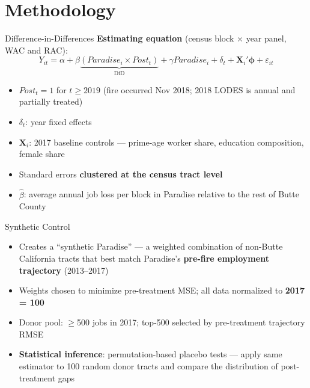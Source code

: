 \documentclass[aspectratio=169, 12pt]{beamer}
\begin{document}
\section{Methodology}

\begin{frame}{Difference-in-Differences}
  \textbf{Estimating equation} (census block $\times$ year panel, WAC and RAC):
  \[
    Y_{it} = \alpha + \beta \underbrace{(\textit{Paradise}_i \times \textit{Post}_t)}_{\text{DiD}}
           + \gamma \textit{Paradise}_i + \delta_t + \mathbf{X}_i' \boldsymbol{\phi} + \varepsilon_{it}
  \]
  \vspace{-0.5em}
  \begin{itemize}
    \item $\textit{Post}_t = 1$ for $t \geq 2019$ (fire occurred Nov 2018;
          2018 LODES is annual and partially treated)
    \item $\delta_t$: year fixed effects
    \item $\mathbf{X}_i$: 2017 baseline controls ---
          prime-age worker share, education composition, female share
    \item Standard errors \textbf{clustered at the census tract level}
    \item $\hat{\beta}$: average annual job loss per block in Paradise
          relative to the rest of Butte County
  \end{itemize}
\end{frame}

\begin{frame}{Synthetic Control}
  \begin{itemize}
    \item Creates a ``synthetic Paradise'' --- a weighted combination of
          non-Butte California tracts that best match Paradise's
          \textbf{pre-fire employment trajectory} (2013--2017)
    \item Weights chosen to minimize pre-treatment MSE;
          all data normalized to \textbf{2017 = 100}
    \item Donor pool: $\geq$500 jobs in 2017; top-500 selected by
          pre-treatment trajectory RMSE
    \item \textbf{Statistical inference}: permutation-based placebo tests ---
          apply same estimator to 100 random donor tracts and compare
          the distribution of post-treatment gaps
  \end{itemize}
\end{frame}
\end{document}
